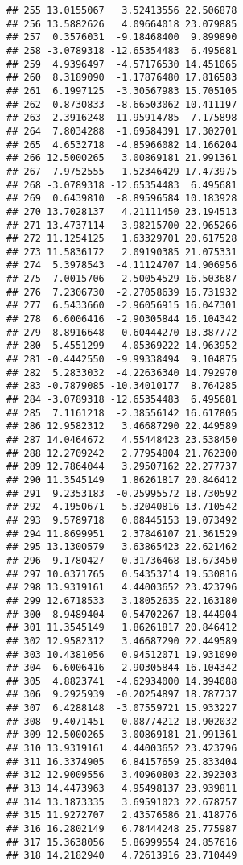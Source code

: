 \documentclass[]{article}
\begin{document}
\begin{verbatim}
## 255 13.0155067   3.52413556 22.506878
## 256 13.5882626   4.09664018 23.079885
## 257  0.3576031  -9.18468400  9.899890
## 258 -3.0789318 -12.65354483  6.495681
## 259  4.9396497  -4.57176530 14.451065
## 260  8.3189090  -1.17876480 17.816583
## 261  6.1997125  -3.30567983 15.705105
## 262  0.8730833  -8.66503062 10.411197
## 263 -2.3916248 -11.95914785  7.175898
## 264  7.8034288  -1.69584391 17.302701
## 265  4.6532718  -4.85966082 14.166204
## 266 12.5000265   3.00869181 21.991361
## 267  7.9752555  -1.52346429 17.473975
## 268 -3.0789318 -12.65354483  6.495681
## 269  0.6439810  -8.89596584 10.183928
## 270 13.7028137   4.21111450 23.194513
## 271 13.4737114   3.98215700 22.965266
## 272 11.1254125   1.63329701 20.617528
## 273 11.5836172   2.09190385 21.075331
## 274  5.3978543  -4.11124707 14.906956
## 275  7.0015706  -2.50054529 16.503687
## 276  7.2306730  -2.27058639 16.731932
## 277  6.5433660  -2.96056915 16.047301
## 278  6.6006416  -2.90305844 16.104342
## 279  8.8916648  -0.60444270 18.387772
## 280  5.4551299  -4.05369222 14.963952
## 281 -0.4442550  -9.99338494  9.104875
## 282  5.2833032  -4.22636340 14.792970
## 283 -0.7879085 -10.34010177  8.764285
## 284 -3.0789318 -12.65354483  6.495681
## 285  7.1161218  -2.38556142 16.617805
## 286 12.9582312   3.46687290 22.449589
## 287 14.0464672   4.55448423 23.538450
## 288 12.2709242   2.77954804 21.762300
## 289 12.7864044   3.29507162 22.277737
## 290 11.3545149   1.86261817 20.846412
## 291  9.2353183  -0.25995572 18.730592
## 292  4.1950671  -5.32040816 13.710542
## 293  9.5789718   0.08445153 19.073492
## 294 11.8699951   2.37846107 21.361529
## 295 13.1300579   3.63865423 22.621462
## 296  9.1780427  -0.31736468 18.673450
## 297 10.0371765   0.54353714 19.530816
## 298 13.9319161   4.44003652 23.423796
## 299 12.6718533   3.18052635 22.163180
## 300  8.9489404  -0.54702267 18.444904
## 301 11.3545149   1.86261817 20.846412
## 302 12.9582312   3.46687290 22.449589
## 303 10.4381056   0.94512071 19.931090
## 304  6.6006416  -2.90305844 16.104342
## 305  4.8823741  -4.62934000 14.394088
## 306  9.2925939  -0.20254897 18.787737
## 307  6.4288148  -3.07559721 15.933227
## 308  9.4071451  -0.08774212 18.902032
## 309 12.5000265   3.00869181 21.991361
## 310 13.9319161   4.44003652 23.423796
## 311 16.3374905   6.84157659 25.833404
## 312 12.9009556   3.40960803 22.392303
## 313 14.4473963   4.95498137 23.939811
## 314 13.1873335   3.69591023 22.678757
## 315 11.9272707   2.43576586 21.418776
## 316 16.2802149   6.78444248 25.775987
## 317 15.3638056   5.86999554 24.857616
## 318 14.2182940   4.72613916 23.710449

\end{verbatim}
\end{document}
